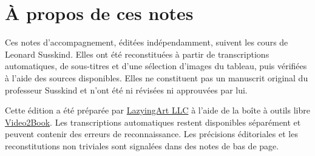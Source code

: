 \documentclass[11pt,oneside]{book}
\begin{document}
\frontmatter
\hypersetup{pageanchor=false}

\hypersetup{pageanchor=true}

\clearpage
\chapter{À propos de ces notes}
Ces notes d’accompagnement, éditées indépendamment, suivent les cours de Leonard Susskind. Elles ont été reconstituées à partir de transcriptions automatiques, de sous-titres et d’une sélection d’images du tableau, puis vérifiées à l’aide des sources disponibles. Elles ne constituent pas un manuscrit original du professeur Susskind et n’ont été ni révisées ni approuvées par lui.

Cette édition a été préparée par \href{https://lazying.art}{LazyingArt LLC} à l’aide de la boîte à outils libre \href{https://github.com/lachlanchen/Video2Book}{Video2Book}. Les transcriptions automatiques restent disponibles séparément et peuvent contenir des erreurs de reconnaissance. Les précisions éditoriales et les reconstitutions non triviales sont signalées dans des notes de bas de page.
\clearpage
\tableofcontents
\mainmatter









\end{document}
